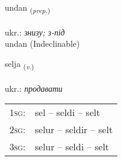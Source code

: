 \documentclass[frontgrid, backgrid]{flacards}\usepackage[]{graphicx}\usepackage[]{xcolor}
\begin{document}

\renewcommand{\flhead}{\vskip5pt \fboxsep=0pt {\small\bfseries\footnotesize Forsetning | прийменник}}
\renewcommand{\fcfoot}{\vskip5pt \fboxsep=0pt \hspace{2pt}{\small\bfseries\footnotesize 1K}}

\renewcommand{\blhead}{\vskip5pt {\small\bfseries\footnotesize Forsetning | прийменник }}
\renewcommand{\bcfoot}{\vskip5pt \hspace{2pt}{\small\bfseries\footnotesize 1K}}


{undan \small{\textsubscript{(\textit{prep.})}} \\[1ex]
\textphonetic{[ʏntan]} \\
ukr.: \emph{знизу; з-під} \\  [2ex]
undan (Indeclinable)}

\renewcommand{\flhead}{\vskip5pt \fboxsep=0pt {\small\bfseries\footnotesize Sagnorð | дієслово}}
\renewcommand{\fcfoot}{\vskip5pt \fboxsep=0pt \hspace{2pt}{\small\bfseries\footnotesize 1K}}

\renewcommand{\blhead}{\vskip5pt {\small\bfseries\footnotesize Sagnorð | дієслово }}
\renewcommand{\bcfoot}{\vskip5pt \hspace{2pt}{\small\bfseries\footnotesize 1K}}


{selja \small{\textsubscript{(\textit{v.})}} \\[1ex] %
\textphonetic{[sɛlja]} \\
ukr.: \emph{продавати} \\  [2ex]
\renewcommand*{\arraystretch}{0.8}
\begin{tabular}{p{1cm}l}
\textsc{1sg}: & sel -- seldi -- selt \\ 
\textsc{2sg}: & selur -- seldir -- selt \\ 
\textsc{3sg}: & selur -- seldi -- selt \\ 
\end{tabular}
}

\renewcommand{\flhead}{\vskip5pt \fboxsep=0pt {\small\bfseries\footnotesize Nafnorð | іменник}}
\renewcommand{\fcfoot}{\vskip5pt \fboxsep=0pt \hspace{2pt}{\small\bfseries\footnotesize 1K}}
\end{document}
